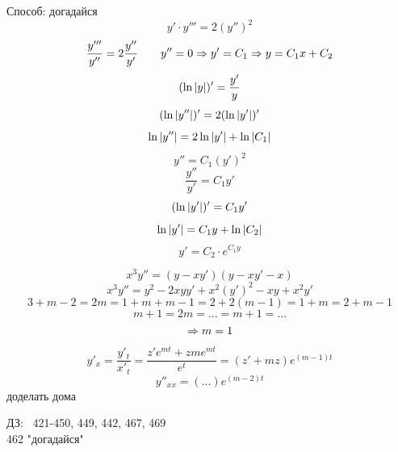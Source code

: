 \documentclass[12pt, fleqn]{article}
\begin{document}
\begin{lect}
     
    \begin{Task}[466]
        Способ: догадайся
        \[y' \cdot y''' = 2(y'')^2\]
        \[\frac{y'''}{y''} = 2 \frac{y''}{y'} \qquad y'' = 0 \Rightarrow y' = C_1 \Rightarrow y = C_1x + C_2\]
        \[(\ln \left|y\right|)' = \frac{y'}{y}\]
        \[(\ln \left|y''\right|)' = 2(\ln \left|y'\right|)'\]
        \[\ln \left|y''\right| = 2\ln \left|y'\right| + \ln \left|C_1\right|\]
        \[y'' = C_1 (y')^2\]
        \[\frac{y''}{y'} = C_1 y'\]
        \[(\ln \left|y'\right|)' = C_1 y'\]
        \[\ln \left|y'\right| = C_1 y + \ln \left|C_2\right|\]
        \[y' = C_2 \cdot e^{C_1 y} \]
    \end{Task}

    \begin{Task}[?]
        \[x^3 y'' = (y - xy')(y - xy' - x)\]
        \[x^3 y'' = y^2 - 2xyy' + x^2(y')^2 - xy + x^2 y'\]
        \[3 + m - 2 = 2m = 1 + m + m -1 = 2 + 2(m - 1) = 1 + m = 2 + m - 1\]
        \[m + 1 = 2m = ... = m + 1 = ...\]
        \[\Rightarrow m = 1\]
        \[y'_x = \frac{y'_t}{x'_t} = \frac{z' e^{mt} + zm e^{mt}  }{e^t} = (z' + mz)e^{(m - 1)t} \]
        \[y''_{xx} = (...) e^{(m - 2)t}  \]
        доделать дома
    \end{Task}

    ДЗ: \ 421-450, 449, 442, 467, 469\\
    462 "догадайся"
    

\end{lect}
\end{document}
